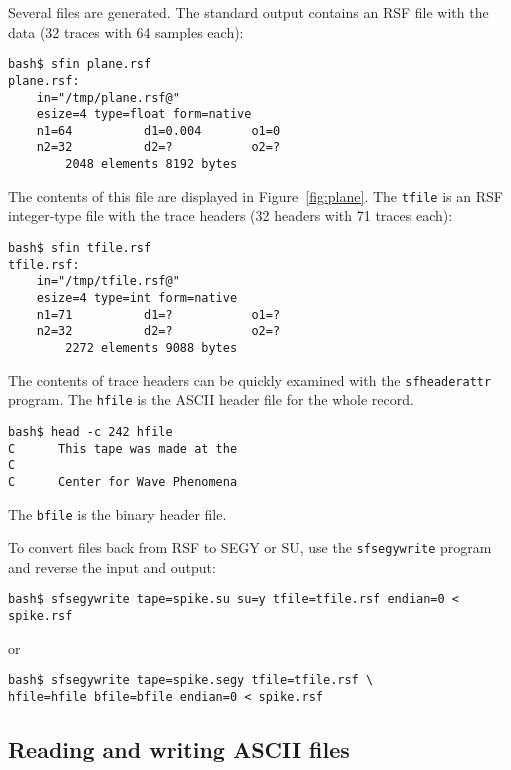 Several files are generated. The standard output contains an RSF file with the
data (32 traces with 64 samples each):
\begin{verbatim}
bash$ sfin plane.rsf
plane.rsf:
    in="/tmp/plane.rsf@"
    esize=4 type=float form=native
    n1=64          d1=0.004       o1=0
    n2=32          d2=?           o2=?
        2048 elements 8192 bytes
\end{verbatim}
The contents of this file are displayed in Figure~\ref{fig:plane}.
The \texttt{tfile} is an RSF integer-type file with the trace headers (32
headers with 71 traces each):
\begin{verbatim}
bash$ sfin tfile.rsf
tfile.rsf:
    in="/tmp/tfile.rsf@"
    esize=4 type=int form=native
    n1=71          d1=?           o1=?
    n2=32          d2=?           o2=?
        2272 elements 9088 bytes
\end{verbatim}
The contents of trace headers can be quickly examined with the 
\texttt{sfheaderattr} program.
The \texttt{hfile} is the ASCII header file for the whole record.
\begin{verbatim}
bash$ head -c 242 hfile
C      This tape was made at the
C                                                                              
C      Center for Wave Phenomena                         
\end{verbatim}
The  \texttt{bfile} is the binary header file.


To convert files back from RSF to SEGY or SU, use the \texttt{sfsegywrite}
program and reverse the input and output:
\begin{verbatim}
bash$ sfsegywrite tape=spike.su su=y tfile=tfile.rsf endian=0 < spike.rsf
\end{verbatim}
or
\begin{verbatim}
bash$ sfsegywrite tape=spike.segy tfile=tfile.rsf \
hfile=hfile bfile=bfile endian=0 < spike.rsf
\end{verbatim}

\subsection{Reading and writing ASCII files}

